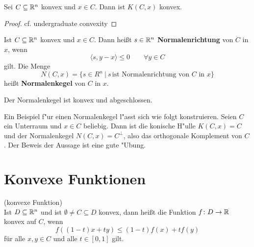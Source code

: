 \begin{Lemma}
	Sei $C\subseteq \mathbb R^n$ konvex und $x\in C$. Dann ist $K(C,x)$ konvex.
\end{Lemma}
\begin{proof}
	cf. undergraduate convexity
\end{proof}
\begin{Definition}
	Ist $C\subseteq\mathbb R^n$ konvex und $x\in C$. Dann hei\ss t $s\in\mathbb R^n$ \textbf{Normalenrichtung} von $C$ in $x$, wenn 
	\begin{equation*}
		\langle s,y-x \rangle \leq 0 \qquad \forall y\in C
	\end{equation*}
	gilt. Die Menge
	\begin{equation*}
		N(C,x) = \lbrace s\in R^n ~\vert~ s \, \text{ist Normalenrichtung von $C$ in $x$} \rbrace
	\end{equation*}
	hei\ss t \textbf{Normalenkegel} von $C$ in $x$.
\end{Definition}
\begin{Bemerkung}
	Der Normalenkegel ist konvex und abgeschlossen.
\end{Bemerkung}
Ein Beispiel f"ur einen Normalenkegel l"asst sich wie folgt konstruieren.
Seien $C$ ein Unterraum und $x \in C$ beliebig.
Dann ist die konische H"ulle $K(C,x) = C$ und der Normalenkegel $N(C,x) = C^\bot$, also das orthogonale Komplement von $C$.
Der Beweis der Aussage ist eine gute "Ubung.
%
\section{Konvexe Funktionen}

\begin{Definition}(konvexe Funktion)\\
	Ist $D\subseteq \mathbb R^n$ und ist $\emptyset \neq C\subseteq D$ konvex, dann hei\ss t die Funktion $f\colon D\to\mathbb R$ konvex auf $C$, wenn
	\begin{equation*}
		f((1-t)x+ty)\leq(1-t)f(x)+tf(y)
	\end{equation*}
	f\"ur alle $x,y\in C$ und alle $t\in\left[0,1 \right]$ gilt.
\end{Definition}

